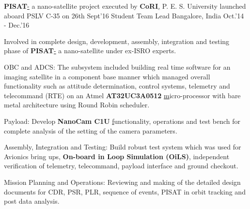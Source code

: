 \begin{cventries}
	\cventry
	{\textbf{PISAT}\href{http://pisat.pes.edu/}- a nano-satellite project executed by \textbf{CoRI}\href{http://cori.pes.edu/}, P. E. S. University launched aboard PSLV C-35 on 26th Sept'16}
	{Student Team Lead}
	{Bangalore, India}
	{Oct.'14 - Dec.'16}
	{
		\begin{cvitems}
		\item{Involved in complete design, development, assembly, integration and testing phase of \textbf{PISAT}\href{https://www.isro.gov.in/Spacecraft/pisat} - a nano-satellite under ex-ISRO experts.}
		\item{OBC and ADCS: The subsystem included building real time software for an imaging satellite in a component base manner which managed overall functionality such as attitude determination, control systems, telemetry and telecommand (RTE) on an Atmel \textbf{AT32UC3A0512 }\href{https://www.microchip.com/wwwproducts/en/AT32UC3A0512} micro-processor with bare metal architecture using Round Robin scheduler.}
		\item{Payload: Develop \textbf{NanoCam C1U }\href{https://gomspace.com/UserFiles/Subsystems/datasheet/gs-ds-nanocam-c1u-17.pdf} functionality, operations and test bench for complete analysis of the setting of the camera parameters.}
		\item{Assembly, Integration and Testing: Build robust test system which was used for Avionics bring ups, \textbf{On-board in Loop Simulation (OiLS)}, independent verification of telemetry, telecommand, payload interface and ground checkout.}
		\item{Mission Planning and Operations: Reviewing and making of the detailed design documents for CDR, PSR, PLR, sequence of events, PISAT in orbit tracking and post data analysis.}
		\end{cvitems}
	}
\end{cventries}
